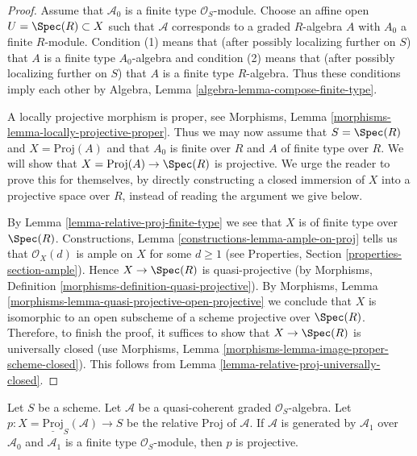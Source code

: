 \begin{proof}
Assume that $\mathcal{A}_0$ is a finite type $\mathcal{O}_S$-module.
Choose an affine open $U = \Spec(R) \subset X$ such that $\mathcal{A}$
corresponds to a graded $R$-algebra $A$ with $A_0$ a finite $R$-module.
Condition (1) means that (after possibly localizing further on $S$)
that $A$ is a finite type $A_0$-algebra and condition (2) means that
(after possibly localizing further on $S$) that $A$ is a finite type
$R$-algebra. Thus these conditions imply each other by
Algebra, Lemma \ref{algebra-lemma-compose-finite-type}.

\medskip\noindent
A locally projective morphism is proper, see
Morphisms, Lemma \ref{morphisms-lemma-locally-projective-proper}.
Thus we may now assume that $S = \Spec(R)$ and $X = \text{Proj}(A)$
and that $A_0$ is finite over $R$ and $A$ of finite type over $R$.
We will show that $X = \text{Proj}(A) \to \Spec(R)$ is projective.
We urge the reader to prove this for themselves, by directly constructing
a closed immersion of $X$ into a projective space over $R$, instead
of reading the argument we give below.

\medskip\noindent
By Lemma \ref{lemma-relative-proj-finite-type}
we see that $X$ is of finite type over $\Spec(R)$.
Constructions, Lemma \ref{constructions-lemma-ample-on-proj}
tells us that $\mathcal{O}_X(d)$ is ample on $X$ for some $d \geq 1$
(see Properties, Section \ref{properties-section-ample}).
Hence $X \to \Spec(R)$ is quasi-projective (by
Morphisms, Definition \ref{morphisms-definition-quasi-projective}).
By Morphisms, Lemma \ref{morphisms-lemma-quasi-projective-open-projective}
we conclude that $X$ is isomorphic to an open subscheme of a scheme
projective over $\Spec(R)$. Therefore, to finish the proof, it suffices
to show that $X \to \Spec(R)$ is universally closed (use
Morphisms, Lemma \ref{morphisms-lemma-image-proper-scheme-closed}).
This follows from Lemma \ref{lemma-relative-proj-universally-closed}.
\end{proof}

\begin{lemma}
\label{lemma-relative-proj-projective}
Let $S$ be a scheme. Let $\mathcal{A}$ be a quasi-coherent graded
$\mathcal{O}_S$-algebra. Let
$p : X = \underline{\text{Proj}}_S(\mathcal{A}) \to S$ be the relative
Proj of $\mathcal{A}$. If $\mathcal{A}$ is generated by
$\mathcal{A}_1$ over $\mathcal{A}_0$ and $\mathcal{A}_1$
is a finite type $\mathcal{O}_S$-module, then $p$ is projective.
\end{lemma}

